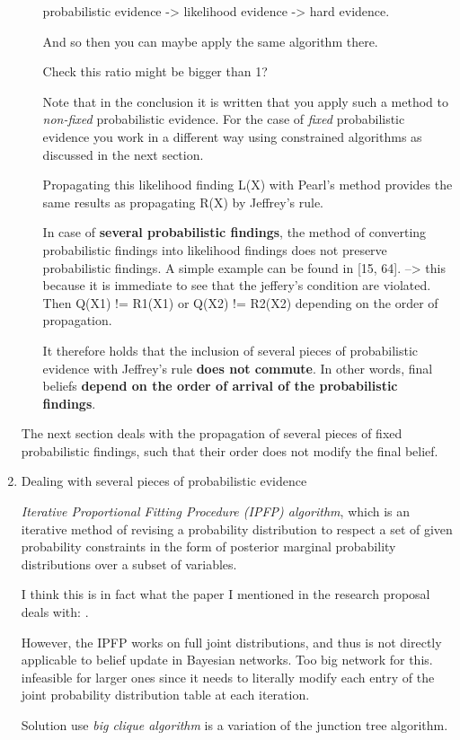 \documentclass[a4paper]{article}
\begin{document}
\begin{enumerate}
\begin{itemize}
probabilistic evidence -> likelihood evidence -> hard evidence.

And so then you can maybe apply the same algorithm there.

Check this ratio might be bigger than 1?

Note that in the conclusion it is written that you apply such a
method to \emph{non-fixed} probabilistic evidence. For the case of
\emph{fixed} probabilistic evidence you work in a different way
using constrained algorithms as discussed in the next section. 

Propagating this likelihood finding L(X) with Pearl’s method
provides the same results as propagating R(X) by Jeffrey’s
rule.

In case of \textbf{several probabilistic findings}, the method of
converting probabilistic findings into likelihood findings does
not preserve probabilistic findings. A simple example can be
found in [15, 64]. --> this because it is immediate to see that
the jeffery's condition are violated. Then Q(X1) != R1(X1) or
Q(X2) != R2(X2) depending on the order of propagation.

It therefore holds that the inclusion of several pieces of
probabilistic evidence with Jeffrey’s rule \textbf{does not commute}. In
other words, final beliefs \textbf{depend on the order of arrival of the
probabilistic findings}.
\end{itemize}


The next section deals with the propagation of several pieces
of fixed probabilistic findings, such that their order does not
modify the final belief.

\item Dealing with several pieces of probabilistic evidence
\label{sec:orgb29c8f0}

\emph{Iterative Proportional Fitting Procedure (IPFP) algorithm}, which
is an iterative method of revising a probability distribution to
respect a set of given probability constraints in the form of
posterior marginal probability distributions over a subset of
variables.

I think this is in fact what the paper I mentioned in the
research proposal deals with: \cite{Masegosa_2016}.

However, the IPFP works on full joint distributions, and thus is
not directly applicable to belief update in Bayesian
networks. Too big network for this. infeasible for larger ones
since it needs to literally modify each entry of the joint
probability distribution table at each iteration.

Solution use \emph{big clique algorithm} is a variation of the
junction tree algorithm.
\end{enumerate}
\end{document}
